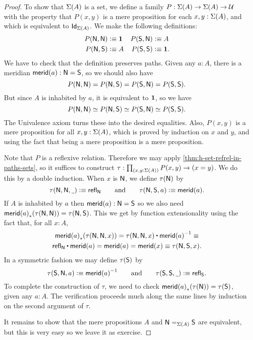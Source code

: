 \begin{proof}
To show that $\susp(A)$ is a set, we define a
family $P:\susp(A)\to\susp(A)\to\type$ with the 
property that $P(x,y)$ is a mere proposition for each $x,y:\susp(A)$,
and which is equivalent to $\idtypevar{\susp(A)}$.
%
We make the following definitions:
\begin{align*}
P(\north,\north) & \defeq \unit &
P(\south,\north) & \defeq A\\
P(\north,\south) & \defeq A &
P(\south,\south) & \defeq \unit.
\end{align*}
We have to check that the definition preserves paths.
Given any $a : A$, there is a meridian $\merid(a) : \north = \south$,
so we should also have
%
\begin{equation*}
  P(\north, \north) = P(\north, \south) = P(\south, \north) = P(\south, \south).
\end{equation*}
%
But since $A$ is inhabited by $a$, it is equivalent to $\unit$, so we have
%
\begin{equation*}
  P(\north, \north) \simeq P(\north, \south) \simeq P(\south, \north) \simeq P(\south, \south).
\end{equation*}
%
The Univalence axiom turns these into the desired equalities. Also, $P(x,y)$ is a mere
proposition for all $x, y : \susp(A)$, which is proved by induction on $x$ and $y$, and
using the fact that being a mere proposition is a mere proposition.

Note that $P$ is a reflexive relation.
Therefore we may apply \autoref{thm:h-set-refrel-in-paths-sets}, so it suffices to
construct $\tau : \prd{x,y:\susp(A)}P(x,y)\to(x=y)$. We do this by a double induction.
When $x$ is $\north$, we define $\tau(\north)$ by
%
\begin{equation*}
  \tau(\north,\north, \blank) \defeq \refl{\north}
  \qquad\text{and}\qquad
  \tau(\north,\south,a) \defeq \merid(a).
\end{equation*}
%
If $A$ is inhabited by $a$ then $\merid(a) : \north = \south$ so we also need $\trans{\merid(a)}{\tau(\north, \north)} =
\tau(\north, \south)$. This we get by function extensionality using the fact that, for all $x : A$,
%
\begin{multline*}
  \trans{\merid(a)}{\tau(\north,\north,x)} =
  \tau(\north,\north,x) \ct \opp{\merid(a)} \jdeq \\
  \refl{\north} \ct \merid(a) =
  \merid(a) =
  \merid(x) \jdeq
  \tau(\north, \south, x).
\end{multline*}
In a symmetric fashion we may define $\tau(\south)$ by
%
\begin{equation*}
  \tau(\south,\north, a) \defeq \opp{\merid(a)}
  \qquad\text{and}\qquad
  \tau(\south,\south, \blank) \defeq \refl{\south}.
\end{equation*}
%
To complete the construction of $\tau$, we need to check $\trans{\merid(a)}{\tau(\north)} = \tau(\south)$,
given any $a : A$. The verification proceeds much along the same lines by induction on the
second argument of $\tau$.

It remains to show that the mere propositions $A$ and $\id[\susp(A)]{\north}{\south}$ are
equivalent, but this is very easy so we leave it as exercise.
\end{proof}

